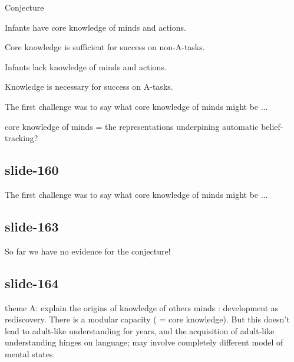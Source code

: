 \documentclass[12pt,\papersize]{extarticle}
\begin{document}
Conjecture





 Infants have core knowledge of minds and actions.



Core knowledge is sufficient for success on non-A-tasks.



 Infants lack knowledge of minds and actions.



 Knowledge is necessary for success on A-tasks.











The first challenge was to say what core knowledge of minds might be ...









core knowledge of minds = the representations underpining automatic belief-tracking?




\subsection{slide-160}
The first challenge was to say what core knowledge of minds might be ...

\subsection{slide-163}
So far we have no evidence for the conjecture!

\subsection{slide-164}
theme A: explain the origins of knowledge of others minds : development as
rediscovery. There is a modular capacity ( = core knowledge). But this
doesn't lead to adult-like understanding for years, and the acquisition of
adult-like understanding hinges on language; may involve completely
different model of mental states.













\end{document}
